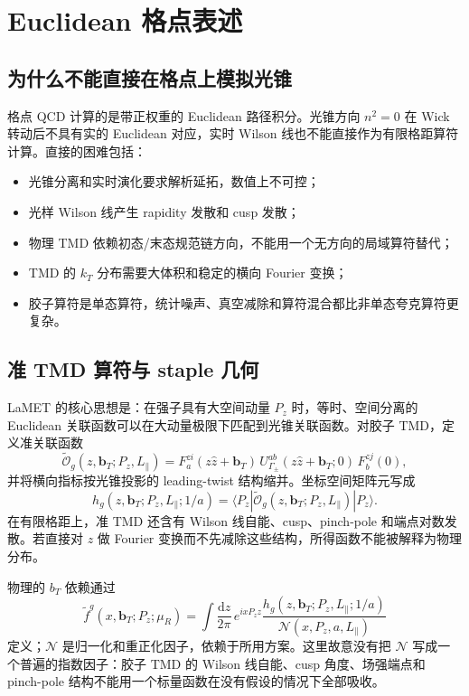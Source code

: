 \documentclass[UTF8,12pt,a4paper,twoside,openany]{ctexbook}
\newcommand{\dd}{\mathrm{d}}
\newcommand{\bT}{\boldsymbol b_T}
\newcommand{\Oq}{\widetilde{\mathcal O}_{g}}
\begin{document}
\clearpage
\chapter{Euclidean 格点表述}

\section{为什么不能直接在格点上模拟光锥}

格点 QCD 计算的是带正权重的 Euclidean 路径积分。光锥方向 \(n^2=0\) 在 Wick 转动后不具有实的 Euclidean 对应，实时 Wilson 线也不能直接作为有限格距算符计算。直接的困难包括：
\begin{itemize}
  \item 光锥分离和实时演化要求解析延拓，数值上不可控；
  \item 光样 Wilson 线产生 rapidity 发散和 cusp 发散；
  \item 物理 TMD 依赖初态/末态规范链方向，不能用一个无方向的局域算符替代；
  \item TMD 的 \(k_T\) 分布需要大体积和稳定的横向 Fourier 变换；
  \item 胶子算符是单态算符，统计噪声、真空减除和算符混合都比非单态夸克算符更复杂。
\end{itemize}

\section{准 TMD 算符与 staple 几何}

LaMET 的核心思想是：在强子具有大空间动量 \(P_z\) 时，等时、空间分离的 Euclidean 关联函数可以在大动量极限下匹配到光锥关联函数\cite{Ji2013,Ji2014,JiReview2021}。对胶子 TMD，定义准关联函数
\begin{equation}
  \Oq(z,\bT;P_z,L_\parallel)
  =
  F^{zi}_a(z\hat z+\bT)\,
  U^{ab}_{\Gamma_\pm}(z\hat z+\bT;0)\,
  F^{zj}_b(0),
  \label{eq:quasioperator}
\end{equation}
并将横向指标按光锥投影的 leading-twist 结构缩并。坐标空间矩阵元写成
\begin{equation}
  h_g(z,\bT;P_z,L_\parallel;1/a)
  =\langle P_z|\Oq(z,\bT;P_z,L_\parallel)|P_z\rangle .
  \label{eq:quasimat}
\end{equation}
在有限格距上，准 TMD 还含有 Wilson 线自能、cusp、pinch-pole 和端点对数发散。若直接对 \(z\) 做 Fourier 变换而不先减除这些结构，所得函数不能被解释为物理分布。

物理的 \(b_T\) 依赖通过
\begin{equation}
  \widetilde f^{g}(x,\bT;P_z;\mu_R)
  =\int\frac{\dd z}{2\pi}\,e^{ixP_z z}
  \frac{h_g(z,\bT;P_z,L_\parallel;1/a)}
  {\mathcal N(x,P_z,a,L_\parallel)}
  \label{eq:quasifourier}
\end{equation}
定义；\(\mathcal N\) 是归一化和重正化因子，依赖于所用方案。这里故意没有把 \(\mathcal N\) 写成一个普遍的指数因子：胶子 TMD 的 Wilson 线自能、cusp 角度、场强端点和 pinch-pole 结构不能用一个标量函数在没有假设的情况下全部吸收。
\end{document}

